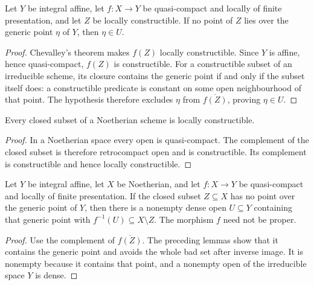 \begin{lemma}\label{lem:kn-relative-arithmetic-generic-avoiding-open}
\leanok
{}
Let $Y$ be integral affine, let $f:X\to Y$ be quasi-compact and locally
of finite presentation, and let $Z$ be locally constructible.  If no
point of $Z$ lies over the generic point $\eta$ of $Y$, then $\eta\in U$.
\end{lemma}
\begin{proof}
Chevalley's theorem makes $f(Z)$ locally constructible.  Since $Y$ is
affine, hence quasi-compact, $f(Z)$ is constructible.  For a constructible
subset of an irreducible scheme, its closure contains the generic point
if and only if the subset itself does: a constructible predicate is
constant on some open neighbourhood of that point.  The hypothesis
therefore excludes $\eta$ from $\overline{f(Z)}$, proving $\eta\in U$.
\end{proof}

\begin{lemma}\label{lem:kn-relative-arithmetic-closed-constructible}
\leanok
Every closed subset of a Noetherian scheme is locally constructible.
\end{lemma}
\begin{proof}
In a Noetherian space every open is quasi-compact.  The complement of
the closed subset is therefore retrocompact open and is constructible.
Its complement is constructible and hence locally constructible.
\end{proof}

\begin{theorem}\label{thm:kn-relative-arithmetic-dense-open-avoiding-closed}
\leanok
{}
Let $Y$ be integral affine, let $X$ be Noetherian, and let $f:X\to Y$
be quasi-compact and locally of finite presentation.  If the closed
subset $Z\subseteq X$ has no point over the generic point of $Y$,
then there is a nonempty dense open $U\subseteq Y$
containing that generic point with $f^{-1}(U)\subseteq X\setminus Z$.
The morphism $f$ need not be proper.
\end{theorem}
\begin{proof}
Use the complement of $\overline{f(Z)}$.  The preceding lemmas show
that it contains the generic point and avoids the whole bad set after
inverse image.  It is nonempty because it contains that point, and a
nonempty open of the irreducible space $Y$ is dense.
\end{proof}
